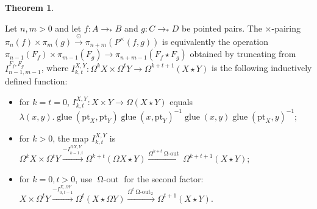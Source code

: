 \documentclass{amsart}
\theoremstyle{definition}
\newtheorem{thm}[theorem]{Theorem}
\newcommand{\glue}{\operatorname{glue}}
\newcommand{\bs}[1]{\mathrm{pt}_{#1}}
\newcommand{\pto}{\to_*}
\newcommand{\oout}{\operatorname{\Omega-out}}
\newcommand{\join}{\star}
\begin{document}
\begin{thm}\label{th:defs-of-pairing}

Let $n,m > 0$ and let $f: A \pto B$ and $g: C \pto D$ be pointed pairs. The $\times$-pairing $\pi_{n}(f) \times \pi_{m}(g) \xrightarrow{\odot} \pi_{n+m}(P^{\times}(f,g))$ is equivalently the operation $\pi_{n-1}(F_f) \times \pi_{m-1}(F_g) \to \pi_{n+m-1}(F_f \join F_g)$ obtained by truncating from $I_{n-1,m-1}^{F_f, F_g}$, where $I_{k,t}^{X,Y}: \Omega^k X \times \Omega^t Y \to \Omega^{k+t+1}(X \join Y)$ is the following inductively defined function:
\begin{itemize}
    \item
for $k=t=0$, $I^{X,Y}_{k,t}: X \times Y \to \Omega (X \join Y)$ equals $\lambda(x,y).\glue(\bs{X},\bs{Y})\glue(x,\bs{Y})^{-1}\glue(x,y)\glue(\bs{X},y)^{-1}$;
    \item
for $k>0$, the map $I_{k,t}^{X,Y}$ is $\Omega^k X \times \Omega^t Y \xrightarrow{-I^{\Omega X,Y}_{k-1,t}} \Omega^{k+t} (\Omega X \join Y) \xrightarrow{\Omega^{k+t}\oout} \Omega^{k+t+1}(X \join Y)$;
    \item
for $k=0, t>0$, use $\oout$ for the second factor: $X \times \Omega^t Y \xrightarrow{-I^{X,\Omega Y}_{0,t-1}} \Omega^{t} (X \join \Omega Y) \xrightarrow{\Omega^{t}\oout_2} \Omega^{t+1}(X \join Y)$.
\end{itemize}
\end{thm}
\end{document}
